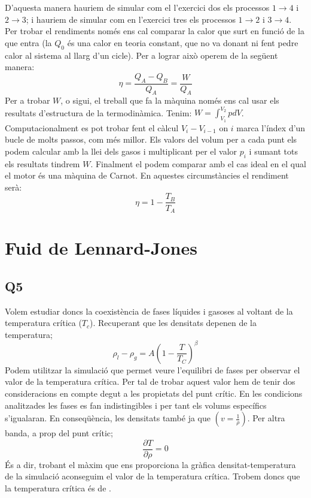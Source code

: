 \documentclass{article}
\begin{document}
	

	
	\par D'aquesta manera hauriem de simular com el l'exercici dos els processos $1\to 4$ i $2 \to 3$; i hauriem de simular com en l'exercici tres els processos $1\to2$ i $3\to4$. Per trobar el rendiments només ens cal comparar la calor que surt en funció de la que entra (la $Q_0$ és una calor en teoria constant, que no va donant ni fent pedre calor al sistema al llarg d'un cicle). Per a lograr això operem de la següent manera: 
	$$
	\eta =\frac{Q_A - Q_B}{Q_A}=\frac{W}{Q_A}
	$$
	Per a trobar $W$, o sigui, el treball que fa la màquina només ens cal usar els resultats d'estructura de la termodinàmica.  Tenim: $W = \int_{V_1}^{V_2} pdV$. Computacionalment es pot trobar fent el càlcul $V_{i}-V_{i-1}$ on $i$ marca l'índex d'un bucle de molts passos, com més millor. Els valors del volum per a cada punt els podem calcular amb la llei dels gasos i multiplicant per el valor $p_{i}$ i sumant tots els resultats tindrem $W$. Finalment el podem comparar amb el cas ideal en el qual el motor és una màquina de Carnot. En aquestes circumstàncies el rendiment serà: 
	$$
	\eta = 1- \frac{T_B}{T_A}
	$$ 
	\section{Fuid de Lennard-Jones}
	
	\subsection*{Q5}
	
	Volem estudiar doncs la coexistència de fases líquides i gasoses al voltant de la temperatura crítica ($T_c$). Recuperant que les densitats depenen de la temperatura;
	\begin{equation} \label{bambi}
		\rho_l-\rho_g = A\left( 1-\frac{T}{T_C}\right)^\beta
	\end{equation}
	Podem utilitzar la simulació que permet veure l'equilibri de fases per observar el valor de la temperatura crítica. 
	Per tal de trobar aquest valor hem de tenir dos consideracions en compte degut a les propietats del punt crític. En les condicions analitzades les fases es fan indistingibles i per tant els volums específics s'igualaran.
	En conseqüència, les densitats també ja que $(v=\frac{1}{\rho})$.
	Per altra banda, a prop del punt crític;
	\begin{equation}
		\frac{\partial T}{\partial \rho}=0
	\end{equation}
	És a dir, trobant el màxim que ens proporciona la gràfica densitat-temperatura de la simulació aconseguim el valor de la temperatura crítica.
	Trobem doncs que la temperatura crítica és de
	.
	\\
	\\
	
\end{document}
